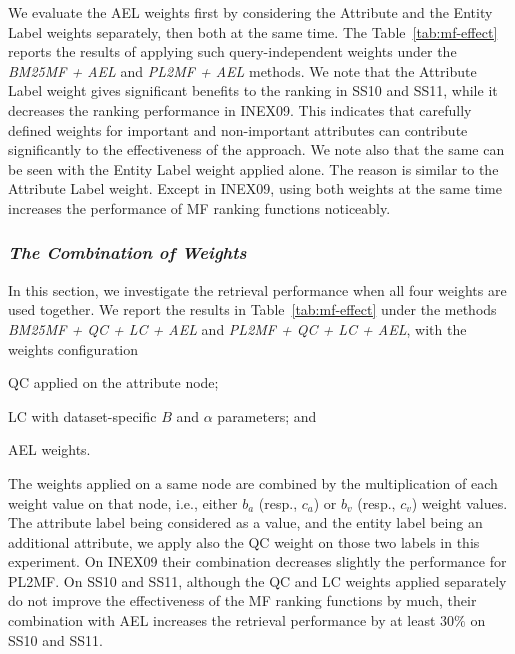 We evaluate the AEL weights first by considering the Attribute and the Entity Label weights separately, then both at the same time. The Table~\ref{tab:mf-effect} reports the results of applying such query-independent weights under the \emph{BM25MF + AEL} and \emph{PL2MF + AEL} methods.
We note that the Attribute Label weight gives significant benefits to the ranking in SS10 and SS11, while it decreases the ranking performance in INEX09. This indicates that carefully defined weights for important and non-important attributes can contribute significantly to the effectiveness of the approach. We note also that the same can be seen with the Entity Label weight applied alone. The reason is similar to the Attribute Label weight.
Except in INEX09, using both weights at the same time increases the performance of MF ranking functions noticeably.

\subsubsection{\emph{The Combination of Weights}}
\label{sec:combi-weight-effect}

In this section, we investigate the retrieval performance when all four weights are used together. We report the results in Table~\ref{tab:mf-effect} under the methods  \emph{BM25MF + QC + LC + AEL} and \emph{PL2MF + QC + LC + AEL}, with the weights configuration
\begin{inparaenum}[(1)]
    \item QC applied on the attribute node;
    \item LC with dataset-specific $B$ and $\alpha$ parameters; and
    \item AEL weights.
\end{inparaenum}
The weights applied on a same node are combined by the multiplication of each weight value on that node, i.e., either $b_a$ (resp., $c_a$) or $b_v$ (resp., $c_v$) weight values.
The attribute label being considered as a value, and the entity label being an additional attribute, we apply also the QC weight on those two labels in this experiment.
On INEX09 their combination decreases slightly the performance for PL2MF. On SS10 and SS11, although the QC and LC weights applied separately do not improve the effectiveness of the MF ranking functions by much, their combination with AEL increases the retrieval performance by at least $30\%$ on SS10 and SS11.


